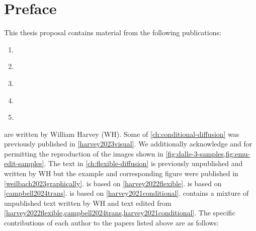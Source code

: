 
\chapter{Preface}

This thesis proposal contains material from the following publications:
\begin{enumerate}
    \item {} \label{harvey2023visual}
    \item {} \label{weilbach2023graphically}
    \item {} \label{harvey2022flexible}
    \item {} \label{campbell2024trans}
    \item {} \label{harvey2021conditional}
\end{enumerate}
 are written by William Harvey (WH). Some of \cref{ch:conditional-diffusion} was previously published in \cref{harvey2023visual}. We additionally acknowledge \citeauthor{sheynin2023emu} and \citeauthor{betker2023improving} for permitting the reproduction of the images shown in \cref{fig:dalle-3-samples,fig:emu-edit-samples}. The text in \cref{ch:flexible-diffusion} is previously unpublished and written by WH but the example and corresponding figure were published in \cref{weilbach2023graphically}.  is based on \cref{harvey2022flexible}.  is based on \cref{campbell2024trans}.  is based on \cref{harvey2021conditional}.  contains a mixture of unpublished text written by WH and text edited from \cref{harvey2022flexible,campbell2024trans,harvey2021conditional}. The specific contributions of each author to the papers listed above are as follows:
